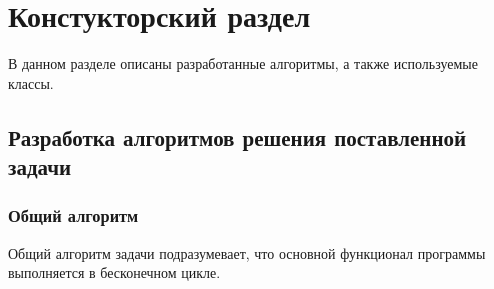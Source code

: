 \chapter{ Констукторский раздел}
\label{cha:design}
    В данном разделе описаны разработанные алгоритмы, а также используемые классы.
    \section{Разработка алгоритмов решения поставленной задачи}
    \subsection{Общий алгоритм}
    \par Общий алгоритм задачи подразумевает, что основной функционал программы выполняется в бесконечном цикле. 
    \begin{figure}[h!]
            \centering

\end{figure}
